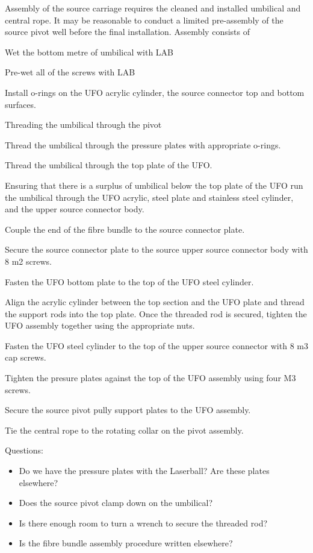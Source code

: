 \documentclass[12pt]{article}
\begin{document}
Assembly of the source carriage requires the cleaned and
installed umbilical and central rope. It may be reasonable to conduct a
limited pre-assembly of the source pivot well before the final
installation. Assembly consists of
\begin{answerlist}
\item Wet the bottom metre of umbilical with LAB
\item Pre-wet all of the screws with LAB
\item Install o-rings on the UFO acrylic cylinder, the source
  connector top and bottom surfaces.
\item Threading the umbilical through the pivot
\item Thread the umbilical through the pressure plates with appropriate o-rings.
\item Thread the umbilical through the top plate of the UFO.
\item Ensuring that there is a surplus of umbilical below the top
  plate of the UFO run the umbilical through the UFO acrylic, steel plate and
  stainless steel cylinder, and the upper source connector body.
\item Couple the end of the fibre bundle to the source connector plate.
\item Secure the source connector plate to the source upper source
  connector body with 8 m2 screws.
\item Fasten the UFO bottom plate to the top of the UFO steel cylinder.
\item Align the acrylic cylinder between the top section and the UFO
  plate and thread the support rods into the top plate. Once the
  threaded rod is secured, tighten the UFO assembly together using the
  appropriate nuts.
\item Fasten the UFO steel cylinder to the top of the upper source
  connector with 8 m3 cap screws.
\item Tighten the presure plates against the top of the UFO assembly
  using four M3 screws.
\item Secure the source pivot pully support plates to the UFO assembly.
\item Tie the central rope to the rotating collar on the pivot assembly.
\end{answerlist}

Questions:
\begin{itemize}
\item Do we have the pressure plates with the Laserball? Are these plates elsewhere?
\item Does the source pivot clamp down on the umbilical?
\item Is there enough room to turn a wrench to secure the threaded rod?
\item Is the fibre bundle assembly procedure written elsewhere?
\end{itemize}
\end{document}
